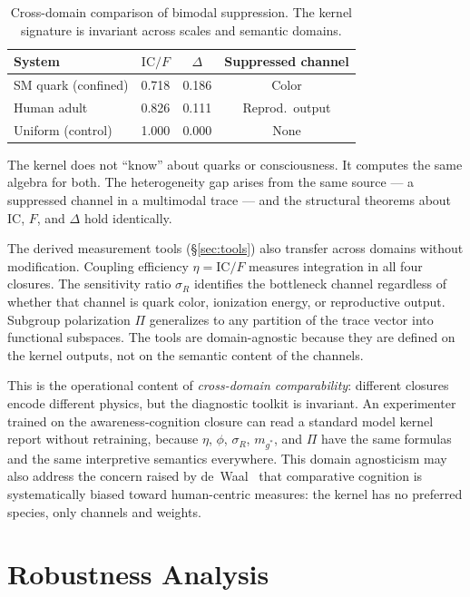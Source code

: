 \documentclass[
  aps,
  prd,
  twocolumn,
  superscriptaddress,
  nofootinbib,
  floatfix
]{revtex4-2}
\newcommand{\IC}{\mathrm{IC}}
\begin{document}
\begin{table}[h]
\caption{\label{tab:crossscale}Cross-domain comparison of
bimodal suppression.  The kernel signature is invariant
across scales and semantic domains.}
\begin{ruledtabular}
\begin{tabular}{lccc}
System & $\IC/F$ & $\Delta$ & Suppressed channel \\
\hline
SM quark (confined) & 0.718 & 0.186 & Color \\
Human adult & 0.826 & 0.111 & Reprod.\ output \\
Uniform (control) & 1.000 & 0.000 & None \\
\end{tabular}
\end{ruledtabular}
\end{table}

The kernel does not ``know'' about quarks or consciousness.
It computes the same algebra for both.  The heterogeneity
gap arises from the same source --- a suppressed channel
in a multimodal trace --- and the structural theorems
about $\IC$, $F$, and $\Delta$ hold identically.

The derived measurement tools (\S\ref{sec:tools}) also
transfer across domains without modification.  Coupling
efficiency $\eta = \IC/F$ measures integration in
all four closures.  The sensitivity ratio $\sigma_R$
identifies the bottleneck channel regardless of whether
that channel is quark color, ionization energy, or
reproductive output.  Subgroup polarization $\Pi$
generalizes to any partition of the trace vector into
functional subspaces.  The tools are domain-agnostic
because they are defined on the kernel outputs, not
on the semantic content of the channels.

This is the operational content of \emph{cross-domain
comparability}: different closures encode different
physics, but the diagnostic toolkit is invariant.  An
experimenter trained on the awareness-cognition closure
can read a standard model kernel report without
retraining, because $\eta$, $\phi$, $\sigma_R$,
$m_{g^*}$, and $\Pi$ have the same formulas and the
same interpretive semantics everywhere.  This domain
agnosticism may also address the concern raised by
de~Waal~\cite{deWaal2016animals} that comparative
cognition is systematically biased toward human-centric
measures: the kernel has no preferred species, only
channels and weights.

\section{Robustness Analysis}\label{sec:robustness}
\end{document}
